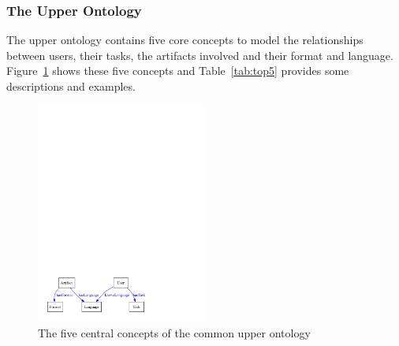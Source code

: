 \subsubsection{The \sa Upper Ontology}
The \sa upper ontology contains five core concepts to model the
relationships between users, their tasks, the artifacts involved and
their format and language. Figure~\ref{fig:centralFive} shows these
five concepts and Table~\ref{tab:top5} provides some descriptions and
examples.

\begin{figure}
  \centering
  \includegraphics[width=0.5\textwidth]{pictures/centralfive.pdf}
  \caption{The five central concepts of the common upper ontology}
  \label{fig:centralFive}
\end{figure}


